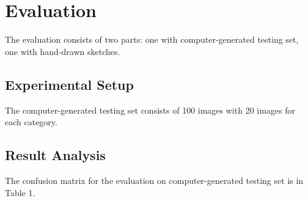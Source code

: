 \section{Evaluation}

The evaluation consists of two parts: one with computer-generated testing set, one with hand-drawn sketches.

\subsection{Experimental Setup}

The computer-generated testing set consists of 100 images with 20 images for each category.

\subsection{Result Analysis}

The confusion matrix for the evaluation on computer-generated testing set is in Table 1.
